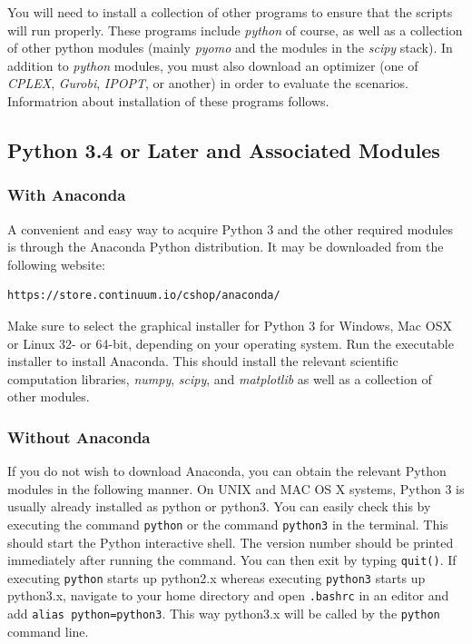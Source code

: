 \documentclass[11pt]{article}
\begin{document}
You will need to install a collection of other programs to ensure that the scripts will run properly. These programs include \textit{python} of course, as well as a collection of other python modules (mainly \textit{pyomo} and the modules in the \textit{scipy} stack). In addition to \textit{python} modules, you must also download an optimizer (one of \textit{CPLEX}, \textit{Gurobi}, \textit{IPOPT}, or another) in order to evaluate the scenarios. Informatrion about installation of these programs follows.

\newcommand{\code}[1]{\textmd{\texttt{#1}}}

\subsection{Python 3.4 or Later and Associated Modules}
\subsubsection{With Anaconda}
A convenient and easy way to acquire Python 3 and the other required modules is through the Anaconda Python distribution. It may be downloaded from the following website:
\begin{verbatim}
https://store.continuum.io/cshop/anaconda/
\end{verbatim}
Make sure to select the graphical installer for Python 3 for Windows, Mac OSX or Linux 32- or 64-bit, depending on your operating system. Run the executable installer to install Anaconda.
This should install the relevant scientific computation libraries, \textit{numpy}, \textit{scipy}, and \textit{matplotlib} as well as a collection of other modules.

\subsubsection{Without Anaconda}

If you do not wish to download Anaconda, you can obtain the relevant Python modules in the following manner.
On UNIX and MAC OS X systems, Python 3 is usually already installed as python or python3. You can easily check this by 
executing the command \texttt{python} or the command \texttt{python3} in the terminal.
This should start the Python interactive shell. The version number should be printed immediately after running the command. You can then exit by typing \texttt{quit()}.
If executing \texttt{python} starts up python2.x whereas executing \texttt{python3} starts up python3.x, navigate to your home directory and open 
\texttt{.bashrc} in an editor and add \texttt{alias python=python3}. 
This way python3.x will be called by the \texttt{python} command line. 
\end{document}
